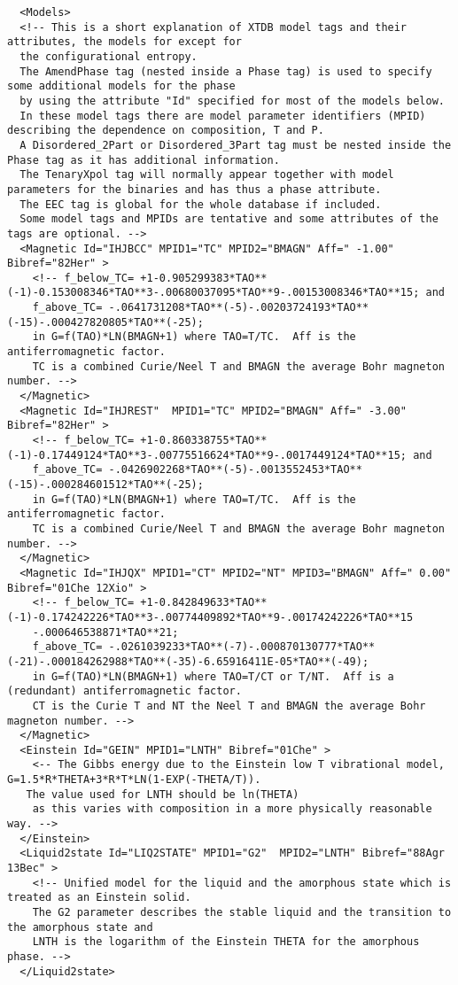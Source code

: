 \documentclass{article}
\begin{document}
\begin{appendices}
{\small
\begin{verbatim}
  <Models>
  <!-- This is a short explanation of XTDB model tags and their attributes, the models for except for
  the configurational entropy.
  The AmendPhase tag (nested inside a Phase tag) is used to specify some additional models for the phase
  by using the attribute "Id" specified for most of the models below.
  In these model tags there are model parameter identifiers (MPID) describing the dependence on composition, T and P.
  A Disordered_2Part or Disordered_3Part tag must be nested inside the Phase tag as it has additional information.
  The TenaryXpol tag will normally appear together with model parameters for the binaries and has thus a phase attribute.
  The EEC tag is global for the whole database if included.
  Some model tags and MPIDs are tentative and some attributes of the tags are optional. -->
  <Magnetic Id="IHJBCC" MPID1="TC" MPID2="BMAGN" Aff=" -1.00" Bibref="82Her" > 
    <!-- f_below_TC= +1-0.905299383*TAO**(-1)-0.153008346*TAO**3-.00680037095*TAO**9-.00153008346*TAO**15; and
    f_above_TC= -.0641731208*TAO**(-5)-.00203724193*TAO**(-15)-.000427820805*TAO**(-25); 
    in G=f(TAO)*LN(BMAGN+1) where TAO=T/TC.  Aff is the antiferromagnetic factor.
    TC is a combined Curie/Neel T and BMAGN the average Bohr magneton number. -->
  </Magnetic>
  <Magnetic Id="IHJREST"  MPID1="TC" MPID2="BMAGN" Aff=" -3.00" Bibref="82Her" > 
    <!-- f_below_TC= +1-0.860338755*TAO**(-1)-0.17449124*TAO**3-.00775516624*TAO**9-.0017449124*TAO**15; and 
    f_above_TC= -.0426902268*TAO**(-5)-.0013552453*TAO**(-15)-.000284601512*TAO**(-25); 
    in G=f(TAO)*LN(BMAGN+1) where TAO=T/TC.  Aff is the antiferromagnetic factor.
    TC is a combined Curie/Neel T and BMAGN the average Bohr magneton number. -->
  </Magnetic>
  <Magnetic Id="IHJQX" MPID1="CT" MPID2="NT" MPID3="BMAGN" Aff=" 0.00" Bibref="01Che 12Xio" > 
    <!-- f_below_TC= +1-0.842849633*TAO**(-1)-0.174242226*TAO**3-.00774409892*TAO**9-.00174242226*TAO**15
    -.000646538871*TAO**21;
    f_above_TC= -.0261039233*TAO**(-7)-.000870130777*TAO**(-21)-.000184262988*TAO**(-35)-6.65916411E-05*TAO**(-49);
    in G=f(TAO)*LN(BMAGN+1) where TAO=T/CT or T/NT.  Aff is a (redundant) antiferromagnetic factor.
    CT is the Curie T and NT the Neel T and BMAGN the average Bohr magneton number. -->
  </Magnetic>
  <Einstein Id="GEIN" MPID1="LNTH" Bibref="01Che" > 
    <-- The Gibbs energy due to the Einstein low T vibrational model, G=1.5*R*THETA+3*R*T*LN(1-EXP(-THETA/T)).
   The value used for LNTH should be ln(THETA)
    as this varies with composition in a more physically reasonable way. -->
  </Einstein>
  <Liquid2state Id="LIQ2STATE" MPID1="G2"  MPID2="LNTH" Bibref="88Agr 13Bec" > 
    <!-- Unified model for the liquid and the amorphous state which is treated as an Einstein solid.
    The G2 parameter describes the stable liquid and the transition to the amorphous state and
    LNTH is the logarithm of the Einstein THETA for the amorphous phase. -->
  </Liquid2state>
\end{verbatim}
}


\end{appendices}
\end{document}
